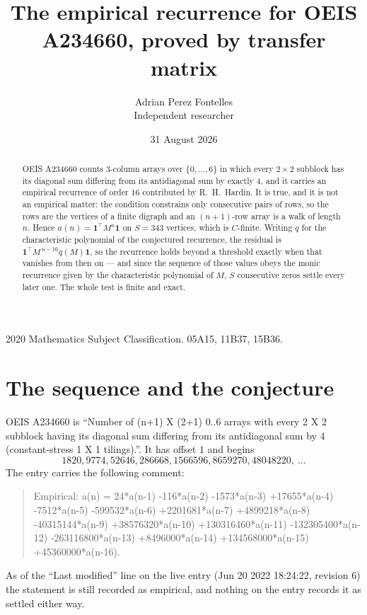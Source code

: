 \documentclass[11pt,a4paper]{article}
\title{The empirical recurrence for OEIS A234660, proved by transfer matrix}
\author{Adrian Perez Fontelles\\ \small Independent researcher}
\date{31 August 2026}
\theoremstyle{plain}
\theoremstyle{definition}
\begin{document}
\maketitle

\begin{abstract}
OEIS A234660 counts $3$-column arrays over $\{0,\dots,6\}$ in which every
$2\times2$ subblock has its diagonal sum differing from its antidiagonal sum by
exactly $4$, and it
carries an empirical recurrence of order $16$ contributed by R.~H.~Hardin. It is true,
and it is not an empirical matter: the condition constrains only consecutive pairs of rows,
so the rows are the vertices of a finite digraph and an $(n+1)$-row array is a walk of
length $n$. Hence $a(n)=\mathbf{1}^{\!\top}M^{n}\mathbf{1}$ on $S=343$ vertices, which
is $C$-finite. Writing $q$ for the characteristic polynomial of the conjectured recurrence,
the residual is $\mathbf{1}^{\!\top}M^{\,n-16}q(M)\mathbf{1}$, so the recurrence
holds beyond a threshold exactly when that vanishes from then on --- and since the sequence
of those values obeys the monic recurrence given by the characteristic polynomial of $M$,
$S$ consecutive zeros settle every later one. The whole test is finite and exact.
\end{abstract}

\noindent\small 2020 Mathematics Subject Classification. 05A15, 11B37, 15B36.\normalsize

\section{The sequence and the conjecture}

OEIS A234660 is ``Number of (n+1) X (2+1) 0..6 arrays with every 2 X 2 subblock having its diagonal sum differing from its antidiagonal sum by 4 (constant-stress 1 X 1 tilings).''. It has offset
$1$ and begins
\[
1820, 9774, 52646, 286668, 1566596, 8659270, 48048220,\ \dots
\]
The entry carries the following comment:
\begin{quote}\small
Empirical: a(n) = 24*a(n-1) -116*a(n-2) -1573*a(n-3) +17655*a(n-4) -7512*a(n-5) -599532*a(n-6) +2201681*a(n-7) +4899218*a(n-8) -40315144*a(n-9) +38576320*a(n-10) +130316460*a(n-11) -132305400*a(n-12) -263116800*a(n-13) +8496000*a(n-14) +134568000*a(n-15) +45360000*a(n-16).
\end{quote}
As of the ``Last modified'' line on the live entry (Jun 20 2022 18:24:22, revision 6) the statement is
still recorded as empirical, and nothing on the entry records it as settled either way.
\end{document}
